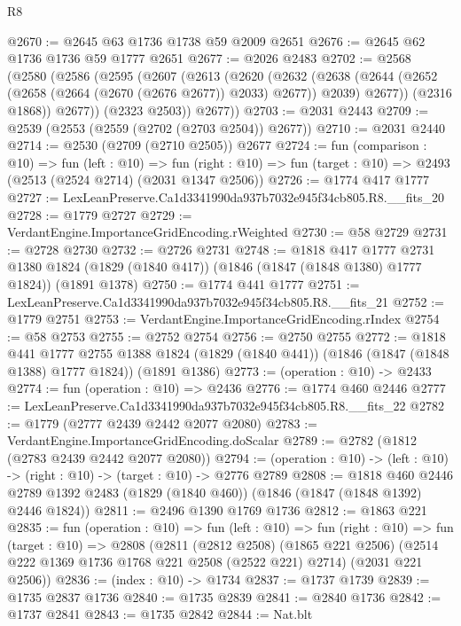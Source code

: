 \begin{lexlean}{R8}
\begin{coremodule}
@2670 := @2645 @63 @1736 @1738 @59 @2009 @2651
@2676 := @2645 @62 @1736 @1736 @59 @1777 @2651
@2677 := @2026 @2483
@2702 := @2568
    (@2580
      (@2586
        (@2595
          (@2607
            (@2613
              (@2620
                (@2632
                  (@2638
                    (@2644 (@2652 (@2658 (@2664 (@2670 (@2676 @2677)) @2033) @2677)) @2039)
                    @2677))
                (@2316 @1868))
              @2677))
          (@2323 @2503))
        @2677))
@2703 := @2031 @2443
@2709 := @2539 (@2553 (@2559 (@2702 (@2703 @2504)) @2677))
@2710 := @2031 @2440
@2714 := @2530 (@2709 (@2710 @2505)) @2677
@2724 := fun (comparison : @10) =>
  fun (left : @10) =>
  fun (right : @10) => fun (target : @10) => @2493 (@2513 (@2524 @2714) (@2031 @1347 @2506))
@2726 := @1774 @417 @1777
@2727 := LexLeanPreserve.Ca1d3341990da937b7032e945f34cb805.R8.__fits_20
@2728 := @1779 @2727
@2729 := VerdantEngine.ImportanceGridEncoding.rWeighted
@2730 := @58 @2729
@2731 := @2728 @2730
@2732 := @2726 @2731
@2748 := @1818
    @417
    @1777
    @2731
    @1380
    @1824
    (@1829 (@1840 @417))
    (@1846 (@1847 (@1848 @1380) @1777 @1824))
    (@1891 @1378)
@2750 := @1774 @441 @1777
@2751 := LexLeanPreserve.Ca1d3341990da937b7032e945f34cb805.R8.__fits_21
@2752 := @1779 @2751
@2753 := VerdantEngine.ImportanceGridEncoding.rIndex
@2754 := @58 @2753
@2755 := @2752 @2754
@2756 := @2750 @2755
@2772 := @1818
    @441
    @1777
    @2755
    @1388
    @1824
    (@1829 (@1840 @441))
    (@1846 (@1847 (@1848 @1388) @1777 @1824))
    (@1891 @1386)
@2773 := (operation : @10) -> @2433
@2774 := fun (operation : @10) => @2436
@2776 := @1774 @460 @2446
@2777 := LexLeanPreserve.Ca1d3341990da937b7032e945f34cb805.R8.__fits_22
@2782 := @1779 (@2777 @2439 @2442 @2077 @2080)
@2783 := VerdantEngine.ImportanceGridEncoding.doScalar
@2789 := @2782 (@1812 (@2783 @2439 @2442 @2077 @2080))
@2794 := (operation : @10) -> (left : @10) -> (right : @10) -> (target : @10) -> @2776 @2789
@2808 := @1818
    @460
    @2446
    @2789
    @1392
    @2483
    (@1829 (@1840 @460))
    (@1846 (@1847 (@1848 @1392) @2446 @1824))
@2811 := @2496 @1390 @1769 @1736
@2812 := @1863 @221
@2835 := fun (operation : @10) =>
  fun (left : @10) =>
  fun (right : @10) =>
  fun (target : @10) =>
  @2808
    (@2811
      (@2812 @2508)
      (@1865 @221 @2506)
      (@2514 @222 @1369 @1736 @1768 @221 @2508 (@2522 @221) @2714)
      (@2031 @221 @2506))
@2836 := (index : @10) -> @1734
@2837 := @1737 @1739
@2839 := @1735 @2837 @1736
@2840 := @1735 @2839
@2841 := @2840 @1736
@2842 := @1737 @2841
@2843 := @1735 @2842
@2844 := Nat.blt

\end{coremodule}
\end{lexlean}
